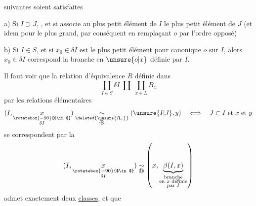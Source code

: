 
suivantes soient satisfaites

a) Si $I\supset J$, , et si     associe au plus petit élément de $I$ le plus petit élément de $J$ (et idem pour le plus grand, par conséquent en  remplaçant $o$ par l'ordre opposé)

b) Si $I\in S$, et si $x_0\in\delta I$ est le plus petit élément pour   canonique $o$ sur $I$, alors   $x_0\in\delta I$ correspond la branche en $\unsure{o|x}$ définie par $I$.

Il faut voir que la relation d'équivalence $R$ définie dans
\[
\coprod_{I\in S}\delta I\ \amalg\ \coprod_{x\in L}B_x
\]
par les relations élémentaires  
\[
(I,\underset{\substack{\rotatebox{-90}{$\in$}\\\delta I}}{x})
\underset{\substack{\deleted{\unsure{R_a}}\\\text{\textcircled{a}}}}{\sim}
(\unsure{I|J},y)
\quad\Longleftrightarrow\quad
J\subset I\text{ et }x\text{ et }y
\]
se correspondent par la  
\[
(I,\underset{\substack{\rotatebox{-90}{$\in$}\\\delta I}}{x})
\underset{\text{\textcircled{b}}}{\sim}
\left(x,\underset{\substack{\text{branche}\\\text{en }x\text{ définie}\\\text{par }I}}{\underbrace{\beta(I,x)}}\right)
\]
admet exactement deux \uline{classes}, et que


